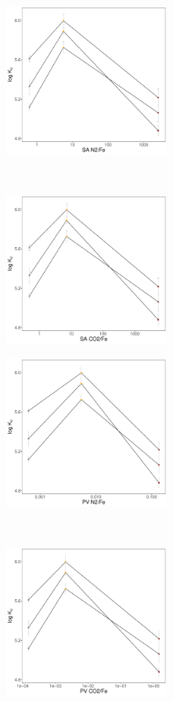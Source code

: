 \begin{figure}[t]\ContinuedFloat
    \begin{subfigure}[t]{0.5\textwidth}
        \centering
        \includegraphics[height=5cm]{R/figs/Kd_1ugL_SAN2_Fe.pdf}
        \caption{}
        \label{subfig:SAN2_Fe}
    \end{subfigure}%
    ~ 
    \begin{subfigure}[t]{0.5\textwidth}
        \centering
        \includegraphics[height=5cm]{R/figs/Kd_1ugL_SACO2_Fe.pdf}
        \caption{}
        \label{subfig:SACO2_Fe}
    \end{subfigure}
    \medskip
    \begin{subfigure}[t]{0.5\textwidth}
        \centering
        \includegraphics[height=5cm]{R/figs/Kd_1ugL_PVN2_Fe.pdf}
        \caption{}
        \label{subfig:PVN2_Fe}
    \end{subfigure}%
    ~ 
    \begin{subfigure}[t]{0.5\textwidth}
        \centering
        \includegraphics[height=5cm]{R/figs/Kd_1ugL_PVCO2_Fe.pdf}
        \caption{}
        \label{subfig:PVCO2_Fe}
    \end{subfigure}
    \label{fig:PVSA_Fe}
    \caption{}
\end{figure}

